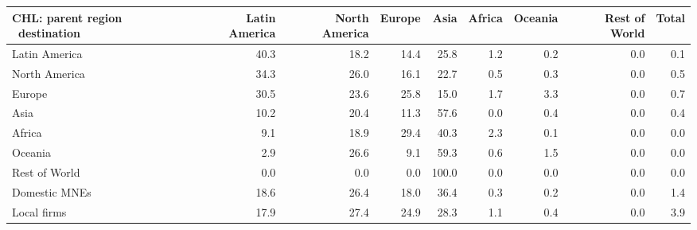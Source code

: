 \begin{tabular}{lrrrrrrrr}
\toprule
CHL: parent region \ destination & Latin America & North America & Europe & Asia & Africa & Oceania & Rest of World & Total \\
\midrule
Latin America & 40.3 & 18.2 & 14.4 & 25.8 & 1.2 & 0.2 & 0.0 & 0.1 \\
North America & 34.3 & 26.0 & 16.1 & 22.7 & 0.5 & 0.3 & 0.0 & 0.5 \\
Europe & 30.5 & 23.6 & 25.8 & 15.0 & 1.7 & 3.3 & 0.0 & 0.7 \\
Asia & 10.2 & 20.4 & 11.3 & 57.6 & 0.0 & 0.4 & 0.0 & 0.4 \\
Africa & 9.1 & 18.9 & 29.4 & 40.3 & 2.3 & 0.1 & 0.0 & 0.0 \\
Oceania & 2.9 & 26.6 & 9.1 & 59.3 & 0.6 & 1.5 & 0.0 & 0.0 \\
Rest of World & 0.0 & 0.0 & 0.0 & 100.0 & 0.0 & 0.0 & 0.0 & 0.0 \\
Domestic MNEs & 18.6 & 26.4 & 18.0 & 36.4 & 0.3 & 0.2 & 0.0 & 1.4 \\
Local firms & 17.9 & 27.4 & 24.9 & 28.3 & 1.1 & 0.4 & 0.0 & 3.9 \\
\bottomrule
\end{tabular}
